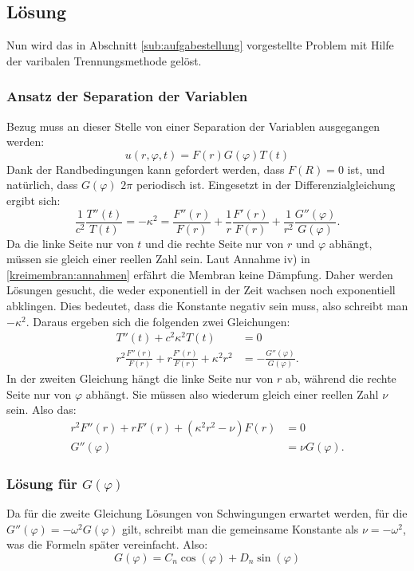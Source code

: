 \subsection{Lösung\label{sub:lösung1}}
Nun wird das in Abschnitt \ref{sub:aufgabestellung} vorgestellte Problem mit Hilfe der varibalen Trennungsmethode gelöst.
\subsubsection{Ansatz der Separation der Variablen\label{subsub:ansatz_separation}}
Bezug muss an dieser Stelle von einer Separation der Variablen ausgegangen werden:
\begin{equation*}
	u(r,\varphi, t) = F(r)G(\varphi)T(t)
\end{equation*}
Dank der Randbedingungen kann gefordert werden, dass $F(R)=0$ ist, und natürlich, dass $G(\varphi)$ $2\pi$ periodisch ist. Eingesetzt in der Differenzialgleichung ergibt sich:
\begin{equation*}
	\frac{1}{c^2}\frac{T''(t)}{T(t)}=-\kappa^2=\frac{F''(r)}{F(r)}+\frac{1}{r}\frac{F'(r)}{F(r)}+\frac{1}{r^2}\frac{G''(\varphi)}{G(\varphi)}.
\end{equation*}
Da die linke Seite nur von $t$ und die rechte Seite nur von $r$ und $\varphi$ abhängt, müssen sie gleich einer reellen Zahl sein. 
Laut Annahme iv) in \ref{kreimembran:annahmen} erfährt die Membran keine Dämpfung.
Daher werden Lösungen gesucht, die weder exponentiell in der Zeit wachsen noch exponentiell abklingen. 
Dies bedeutet, dass die Konstante negativ sein muss, also schreibt man $-\kappa^2$. Daraus ergeben sich die folgenden zwei Gleichungen:
\begin{align*}
	T''(t) + c^2\kappa^2T(t) &= 0\\
	r^2\frac{F''(r)}{F(r)} + r \frac{F'(r)}{F(r)} +\kappa^2 r^2 &= - \frac{G''(\varphi)}{G(\varphi)}.
\end{align*}
In der zweiten Gleichung hängt die linke Seite nur von $r$ ab, während die rechte Seite nur von $\varphi$ abhängt. Sie müssen also wiederum gleich einer reellen Zahl $\nu$ sein. Also das:
\begin{align*}
	r^2F''(r) + rF'(r) + (\kappa^2 r^2 - \nu)F(r) &= 0 \\
	G''(\varphi) &= \nu G(\varphi).
\end{align*}

\subsubsection{Lösung für $G(\varphi)$\label{subsub:lösung_G}}
Da für die zweite Gleichung Lösungen von Schwingungen erwartet werden, für die $G''(\varphi)=-\omega^2 G(\varphi)$ gilt, schreibt man die gemeinsame Konstante als $\nu=-\omega^2$, was die Formeln später vereinfacht. Also:
\begin{equation*}
 G(\varphi) = C_n \cos(\varphi) + D_n \sin(\varphi)
 \label{eq:cos_sin_überlagerung}
\end{equation*}

